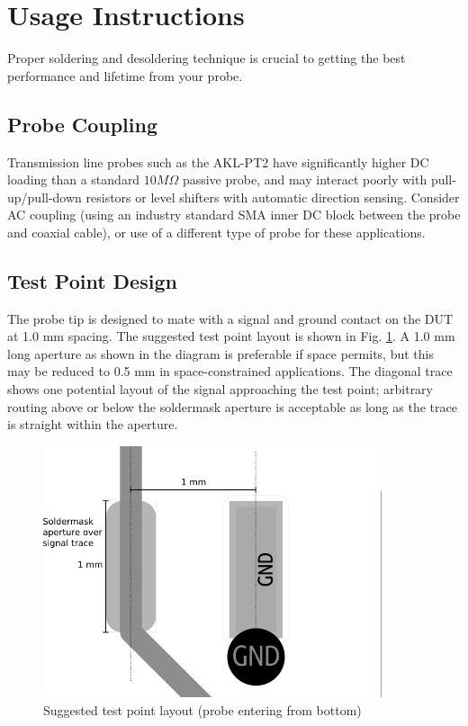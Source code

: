 \documentclass[11pt]{article}
\begin{document}
\pagebreak

\section{Usage Instructions}

Proper soldering and desoldering technique is crucial to getting the best performance and lifetime from your probe.

\subsection{Probe Coupling}

Transmission line probes such as the AKL-PT2 have significantly higher DC loading than a standard $10M\Omega$ passive
probe, and may interact poorly with pull-up/pull-down resistors or level shifters with automatic direction sensing.
Consider AC coupling (using an industry standard SMA inner DC block between the probe and coaxial cable), or use of a
different type of probe for these applications.

\subsection{Test Point Design}

The probe tip is designed to mate with a signal and ground contact on the DUT at 1.0 mm spacing. The suggested test
point layout is shown in Fig. \ref{footprint}. A 1.0 mm long aperture as shown in the diagram is preferable if space
permits, but this may be reduced to 0.5 mm in space-constrained applications. The diagonal trace shows one potential
layout of the signal approaching the test point; arbitrary routing above or below the soldermask aperture is acceptable
as long as the trace is straight within the aperture.

\begin{figure}[h]
\centering
\includegraphics[width=10cm]{footprint.png}
\caption{Suggested test point layout (probe entering from bottom)}
\label{footprint}
\end{figure}
\end{document}
